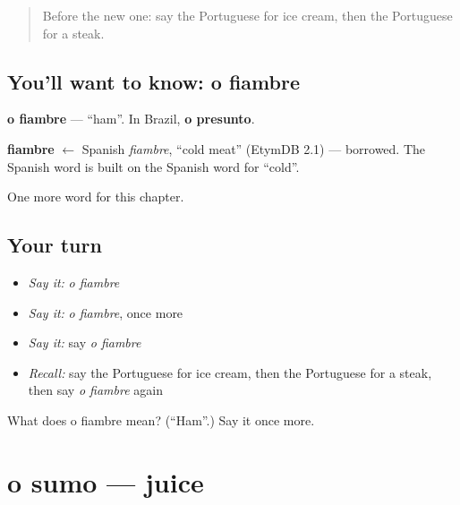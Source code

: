 \label{lesson:PT-C108-fiambre}



\begin{quote}
Before the new one: say the Portuguese for ice cream, then the Portuguese for a steak.
\end{quote}

\subsection*{You'll want to know: o fiambre}
\textbf{o fiambre} — \textquotedblleft{}ham\textquotedblright{}. In Brazil, \textbf{o presunto}.

\begin{cousinweb}
\textbf{fiambre} $\leftarrow$ Spanish \emph{fiambre}, \textquotedblleft{}cold meat\textquotedblright{} (EtymDB 2.1) — borrowed. The Spanish word is built on the Spanish word for \textquotedblleft{}cold\textquotedblright{}.
\end{cousinweb}

\begin{grammarlens}[title={What you've built}]
One more word for this chapter.
\end{grammarlens}

\subsection*{Your turn}
\begin{itemize}
\raggedright
  \item \emph{Say it:} \emph{o fiambre}
  \item \emph{Say it:} \emph{o fiambre}, once more
  \item \emph{Say it:} say \emph{o fiambre}
  \item \emph{Recall:} say the Portuguese for ice cream, then the Portuguese for a steak, then say \emph{o fiambre} again
\end{itemize}

\begin{tcolorbox}[breakable,colback=teal!4,colframe=teal!35!black,title={Before you move on}]
What does o fiambre mean? (\textquotedblleft{}Ham\textquotedblright{}.) Say it once more.
\end{tcolorbox}
\section[o sumo]{o sumo — juice}

\label{lesson:PT-C108-sumo}



